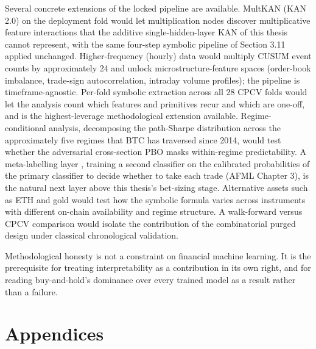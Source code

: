 \documentclass[12pt,a4paper,oneside]{article}
\begin{document}
Several concrete extensions of the locked pipeline are available. MultKAN (KAN 2.0) on the deployment fold \citep{liu_kan2_2024} would let multiplication nodes discover multiplicative feature interactions that the additive single-hidden-layer KAN of this thesis cannot represent, with the same four-step symbolic pipeline of Section 3.11 applied unchanged. Higher-frequency (hourly) data would multiply CUSUM event counts by approximately 24 and unlock microstructure-feature spaces (order-book imbalance, trade-sign autocorrelation, intraday volume profiles); the pipeline is timeframe-agnostic. Per-fold symbolic extraction across all 28 CPCV folds would let the analysis count which features and primitives recur and which are one-off, and is the highest-leverage methodological extension available. Regime-conditional analysis, decomposing the path-Sharpe distribution across the approximately five regimes that BTC has traversed since 2014, would test whether the adversarial cross-section PBO masks within-regime predictability. A meta-labelling layer \citep{singh_joubert_2019}, training a second classifier on the calibrated probabilities of the primary classifier to decide whether to take each trade (AFML Chapter 3), is the natural next layer above this thesis's bet-sizing stage. Alternative assets such as ETH and gold would test how the symbolic formula varies across instruments with different on-chain availability and regime structure. A walk-forward versus CPCV comparison would isolate the contribution of the combinatorial purged design under classical chronological validation.

Methodological honesty is not a constraint on financial machine learning. It is the prerequisite for treating interpretability as a contribution in its own right, and for reading buy-and-hold's dominance over every trained model as a result rather than a failure.


\newpage
{}
\thispagestyle{plain}

\nocite{*}



\newpage
{}
\thispagestyle{plain}

\appendix
\section{Appendices}\label{sec:appendices}
\end{document}
